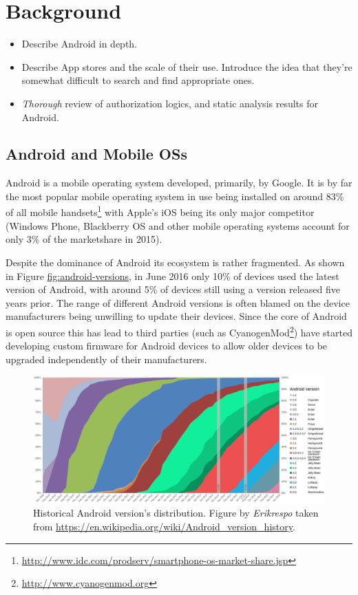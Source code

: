 \documentclass[thesis.tex]{subfiles}
\begin{document}
\chapter{Background}

\begin{todo}
  \begin{itemize}
  \item Describe Android in depth.
  \item Describe App stores and the scale of their use.  Introduce
    the idea that they're somewhat difficult to search and find appropriate
    ones.
  \item \emph{Thorough} review of authorization logics, and static analysis
    results for Android.
  \end{itemize}
\end{todo}

\section{Android and Mobile OSs}\label{android}

Android is a mobile operating system developed, primarily, by Google. It
is by far the most popular mobile operating system in use being
installed on around 83\% of all mobile handsets\footnote{\url{http://www.idc.com/prodserv/smartphone-os-market-share.jsp}}
with Apple's iOS being its only major competitor (Windows Phone,
Blackberry OS and other mobile operating systems account for only 3\% of
the marketshare in 2015).

Despite the dominance of Android its ecosystem is rather fragmented. As
shown in Figure \url{fig:android-versions}, in June 2016 only 10\% of
devices used the latest version of Android, with around 5\% of devices
still using a version released five years prior. The range of different
Android versions is often blamed on the device manufacturers being
unwilling to update their devices. Since the core of Android is open
source this has lead to third parties (such as CyanogenMod\footnote{\url{http://www.cyanogenmod.org}})
have started developing custom firmware for Android devices to allow
older devices to be upgraded independently of their manufacturers.

\begin{figure}[htbp]
\centering
\includegraphics[width=\linewidth]{figures/android-versions.pdf}
\caption[Historical Android version's distribution.]{Historical Android version's distribution. Figure by \emph{Erikrespo} taken from \url{https://en.wikipedia.org/wiki/Android_version_history}.}
\end{figure}
\end{document}
